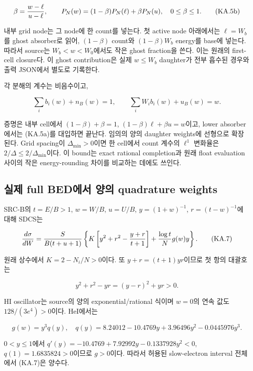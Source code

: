 \documentclass[11pt,a4paper]{article}
\begin{document}
\[
 \beta={w-\ell\over u-\ell},\qquad
 P_N(w)=(1-\beta)P_N(\ell)+\beta P_N(u),\quad0\le\beta\le1.
 \tag{KA.5b}
\]

내부 grid node는 그 node에 한 count를 넣는다. 첫 active node 아래에서는 \(\ell=W_b\)를 ghost absorber로 읽어, \((1-\beta)\) count와 \((1-\beta)W_b\) energy를 base에 넣는다. 따라서 source는 \(W_b<w<W_0\)에서도 작은 ghost fraction을 쓴다. 이는 원래의 first-cell closure다. 이 ghost contribution은 실제 \(w\le W_b\) daughter가 전부 흡수된 경우와 출력 JSON에서 별도로 기록한다.

각 분해의 계수는 비음수이고,

\[
 \sum_i b_i(w)+n_B(w)=1,\qquad
 \sum_iW_i b_i(w)+u_B(w)=w.
 \tag{KA.6}
\]

증명은 내부 cell에서 \((1-\beta)+\beta=1\), \((1-\beta)\ell+\beta u=w\)이고, lower absorber에서는 (KA.5a)를 대입하면 끝난다. 임의의 양의 daughter weights에 선형으로 확장된다. Grid spacing이 \(\Delta_{\min}>0\)이면 한 cell에서 count 계수의 \(\ell^1\) 변화율은 \(2/\Delta\le2/\Delta_{\min}\)이다. 이 bound는 exact rational completion과 원래 float evaluation 사이의 작은 energy-rounding 차이를 비교하는 데에도 쓰인다.

\hypertarget{uxc2e4uxc81c-full-beduxc5d0uxc11c-uxc591uxc758-quadrature-weights}{%
\subsection{실제 full BED에서 양의 quadrature weights}\label{uxc2e4uxc81c-full-beduxc5d0uxc11c-uxc591uxc758-quadrature-weights}}

SRC-B의 \(t=E/B>1\), \(w=W/B\), \(u=U/B\), \(y=(1+w)^{-1}\), \(r=(t-w)^{-1}\)에 대해 SDCS는

\[
 {d\sigma\over dW}={S\over B(t+u+1)}
 \left\{K\left[y^2+r^2-{y+r\over t+1}\right]
                  +{\log t\over N}g(w)y\right\}.
 \tag{KA.7}
\]

원래 상수에서 \(K=2-N_i/N>0\)이다. 또 \(y+r=(t+1)yr\)이므로 첫 항의 대괄호는

\[
 y^2+r^2-yr=(y-r)^2+yr>0.
 \tag{KA.8}
\]

HI oscillator는 source의 양의 exponential/rational 식이며 \(w=0\)의 연속 값도 \(128/(3e^4)>0\)이다. HeI에서는

\[
 g(w)=y^3 q(y),\quad q(y)=8.24012-10.4769y+3.96496y^2-0.0445976y^3.
 \tag{KA.9}
\]

\(0<y\le1\)에서 \(q'(y)=-10.4769+7.92992y-0.1337928y^2<0\), \(q(1)=1.6835824>0\)이므로 \(g>0\)이다. 따라서 허용된 slow-electron interval 전체에서 (KA.7)은 양수다.
\end{document}
